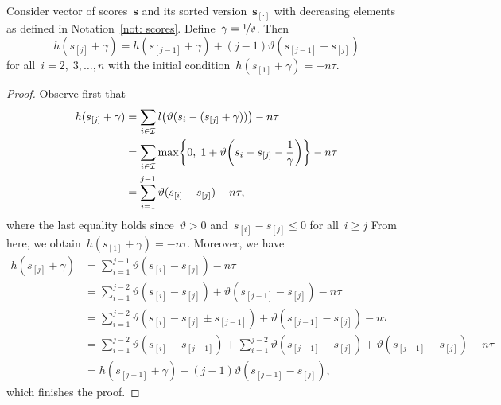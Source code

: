 \begin{lemma}
  Consider vector of scores~$\bm{s}$ and its sorted version~$\bm{s}_{[\cdot]}$ with decreasing elements as defined in Notation~\ref{not: scores}. Define~$\gamma = \nicefrac{1}{\vartheta}$. Then 
  \begin{equation}\label{eq:update_h}
    h(s_{[j]} + \gamma) = h(s_{[j - 1]} + \gamma) + (j - 1) \vartheta(s_{[j - 1]} - s_{[j]})
  \end{equation}
  for all~$i = 2, \; 3, \ldots, n$ with the initial condition~$h(s_{[1]} + \gamma) = -n\tau$.
\end{lemma}
\begin{proof}
Observe first that
\begin{equation*}
  \begin{aligned}
    h(s_{[j]}+\gamma)
      & = \sum_{i \in \I} l\Brac{\vartheta(s_i - (s_{[j]} + \gamma))} - n\tau \\
      & = \sum_{i \in \I} \max\Brac[c]{0,\; 1 + \vartheta\Brac{s_i - s_{[j]} - \frac{1}{\gamma}}} - n\tau \\
      & = \sum_{i = 1}^{j - 1} \vartheta(s_{[i]} - s_{[j]}) - n\tau,
  \end{aligned}
\end{equation*}
where the last equality holds since~$\vartheta > 0$ and~$s_{[i]} - s_{[j]} \leq 0$ for all~$i \geq j$
From here, we obtain~$h(s_{[1]} + \gamma) = -n\tau$. Moreover, we have
\begin{equation*}
  \begin{aligned}
    h(s_{[j]} + \gamma)
    & = \sum_{i = 1}^{j - 1} \vartheta(s_{[i]} - s_{[j]}) - n\tau \\
    & = \sum_{i = 1}^{j - 2} \vartheta(s_{[i]} - s_{[j]}) + \vartheta(s_{[j-1]} - s_{[j]}) - n\tau \\
    & = \sum_{i = 1}^{j - 2} \vartheta(s_{[i]} - s_{[j]} \pm s_{[j - 1]}) + \vartheta(s_{[j-1]} - s_{[j]}) - n\tau \\
    & = \sum_{i = 1}^{j - 2} \vartheta(s_{[i]} - s_{[j - 1]}) + \sum_{i = 1}^{j - 2} \vartheta(s_{[j - 1]} - s_{[j]}) + \vartheta(s_{[j - 1]} - s_{[j]}) - n\tau \\
    & = h(s_{[j - 1]} + \gamma) + (j - 1) \vartheta(s_{[j - 1]} - s_{[j]}),
  \end{aligned}
\end{equation*}
which finishes the proof.
\end{proof}

